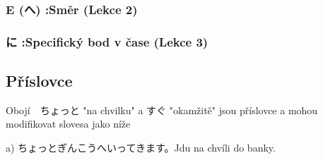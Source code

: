 \subsubsection{E (へ) :Směr  (Lekce 2)}

\subsubsection{に :Specifický bod v čase (Lekce 3)}


\subsection{Příslovce}


Obojí　ちょっと   "na chvilku" a  すぐ  "okamžitě" jsou příslovce a mohou modifikovat slovesa jako níže

a) ちょっとぎんこうへいってきます。Jdu na chvíli do banky. 



















